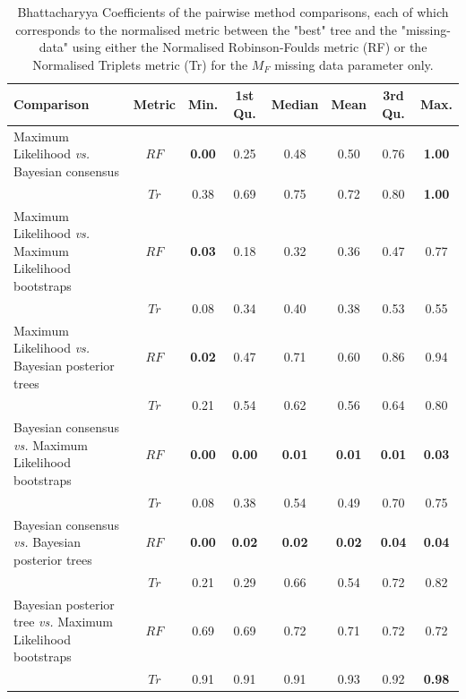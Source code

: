 \begin{landscape}
\begin{table}[!htb]
\caption[Bhattacharyya Coefficients of the pairwise method comparisons ($M_{F}$).]{Bhattacharyya Coefficients of the pairwise method comparisons, each of which corresponds to the normalised metric between the "best" tree and the "missing-data" using either the Normalised Robinson-Foulds metric (RF) or the Normalised Triplets metric (Tr) for the $M_{F}$ missing data parameter only.}
\label{Tab_Supp_summary_BC_MF}
\centering
\begin{tabular}{lccccccc}
  \hline
 Comparison &  Metric & Min. & 1st Qu. & Median & Mean & 3rd Qu. & Max. \\  
  \hline
    Maximum Likelihood \textit{vs.} Bayesian consensus                 & $RF$ & \textbf{0.00} & 0.25 & 0.48 & 0.50 & 0.76 & \textbf{1.00} \\ 
                                                                       & $Tr$ & 0.38 & 0.69 & 0.75 & 0.72 & 0.80 & \textbf{1.00} \\ 
    Maximum Likelihood \textit{vs.} Maximum Likelihood bootstraps      & $RF$ & \textbf{0.03} & 0.18 & 0.32 & 0.36 & 0.47 & 0.77 \\ 
                                                                       & $Tr$ & 0.08 & 0.34 & 0.40 & 0.38 & 0.53 & 0.55 \\ 
    Maximum Likelihood \textit{vs.} Bayesian posterior trees           & $RF$ & \textbf{0.02} & 0.47 & 0.71 & 0.60 & 0.86 & 0.94 \\ 
                                                                       & $Tr$ & 0.21 & 0.54 & 0.62 & 0.56 & 0.64 & 0.80 \\ 
    Bayesian consensus \textit{vs.} Maximum Likelihood bootstraps      & $RF$ & \textbf{0.00} & \textbf{0.00} & \textbf{0.01} & \textbf{0.01} & \textbf{0.01} & \textbf{0.03} \\ 
                                                                       & $Tr$ & 0.08 & 0.38 & 0.54 & 0.49 & 0.70 & 0.75 \\ 
    Bayesian consensus \textit{vs.} Bayesian posterior trees           & $RF$ & \textbf{0.00} & \textbf{0.02} & \textbf{0.02} & \textbf{0.02} & \textbf{0.04} & \textbf{0.04} \\ 
                                                                       & $Tr$ & 0.21 & 0.29 & 0.66 & 0.54 & 0.72 & 0.82 \\ 
    Bayesian posterior tree \textit{vs.} Maximum Likelihood bootstraps & $RF$ & 0.69 & 0.69 & 0.72 & 0.71 & 0.72 & 0.72 \\ 
                                                                       & $Tr$ & 0.91 & 0.91 & 0.91 & 0.93 & 0.92 & \textbf{0.98} \\ 
   \hline
\end{tabular}
\end{table}
\end{landscape}

